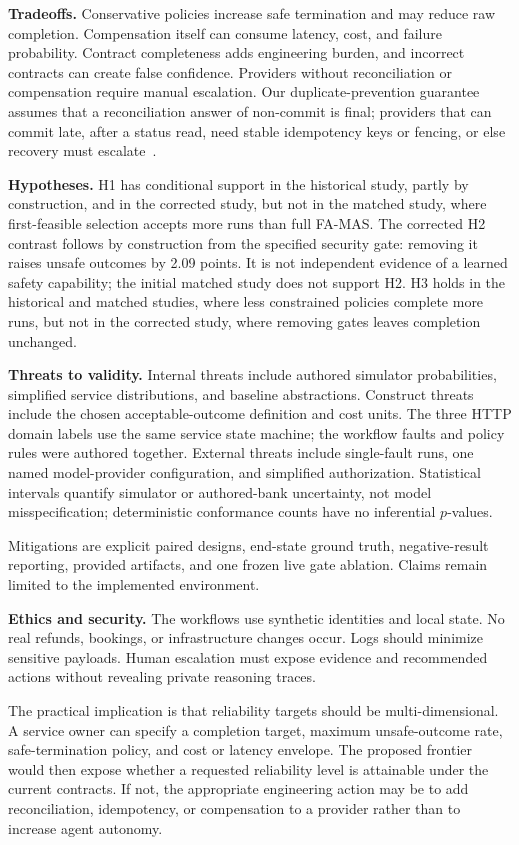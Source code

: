 \documentclass[10pt,journal,compsoc]{IEEEtran}
\newcommand{\famas}{FA-MAS}
\begin{document}
\textbf{Tradeoffs.} Conservative policies increase safe termination and may reduce raw completion. Compensation itself can consume latency, cost, and failure probability. Contract completeness adds engineering burden, and incorrect contracts can create false confidence. Providers without reconciliation or compensation require manual escalation. Our duplicate-prevention guarantee assumes that a reconciliation answer of non-commit is final; providers that can commit late, after a status read, need stable idempotency keys or fencing, or else recovery must escalate~\cite{li2026exactlyonce}.

\textbf{Hypotheses.} H1 has conditional support in the historical study, partly by construction, and in the corrected study, but not in the matched study, where first-feasible selection accepts more runs than full \famas{}. The corrected H2 contrast follows by construction from the specified security gate: removing it raises unsafe outcomes by 2.09 points. It is not independent evidence of a learned safety capability; the initial matched study does not support H2. H3 holds in the historical and matched studies, where less constrained policies complete more runs, but not in the corrected study, where removing gates leaves completion unchanged.

\textbf{Threats to validity.} Internal threats include authored simulator probabilities, simplified service distributions, and baseline abstractions. Construct threats include the chosen acceptable-outcome definition and cost units. The three HTTP domain labels use the same service state machine; the workflow faults and policy rules were authored together. External threats include single-fault runs, one named model-provider configuration, and simplified authorization. Statistical intervals quantify simulator or authored-bank uncertainty, not model misspecification; deterministic conformance counts have no inferential $p$-values.

Mitigations are explicit paired designs, end-state ground truth, negative-result reporting, provided artifacts, and one frozen live gate ablation. Claims remain limited to the implemented environment.

\textbf{Ethics and security.} The workflows use synthetic identities and local state. No real refunds, bookings, or infrastructure changes occur. Logs should minimize sensitive payloads. Human escalation must expose evidence and recommended actions without revealing private reasoning traces.

The practical implication is that reliability targets should be multi-dimensional. A service owner can specify a completion target, maximum unsafe-outcome rate, safe-termination policy, and cost or latency envelope. The proposed frontier would then expose whether a requested reliability level is attainable under the current contracts. If not, the appropriate engineering action may be to add reconciliation, idempotency, or compensation to a provider rather than to increase agent autonomy.
\end{document}
